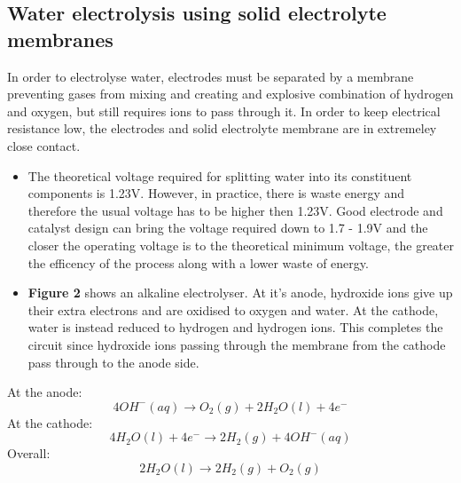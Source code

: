 \documentclass{article}
\begin{document}
    \subsection{Water electrolysis using solid electrolyte membranes}
    In order to electrolyse water, electrodes must be separated by a membrane preventing gases from mixing 
    and creating and explosive combination of hydrogen and oxygen, but still requires ions to pass through it. 
    In order to keep electrical resistance low, the electrodes and solid electrolyte membrane are in extremeley close contact. 
    \newline
    \begin{itemize}
        \item The theoretical voltage required for splitting water into its constituent components is 1.23V. 
        However, in practice, there is waste energy and therefore the usual voltage has to be higher then 1.23V. 
        Good electrode and catalyst design can bring the voltage required down to 1.7 - 1.9V and the closer the operating 
        voltage is to the theoretical minimum voltage, the greater the efficency of the process along with a lower waste of energy.
        \item \textbf{Figure 2} shows an alkaline electrolyser. At it's anode, hydroxide ions give up their extra electrons and are 
        oxidised to oxygen and water. At the cathode, water is instead reduced to hydrogen and hydrogen ions. This completes the 
        circuit since hydroxide ions passing through the membrane from the cathode pass through to the anode side.
    \end{itemize}
    At the anode: \cite{ETH}
    \begin{equation}
        4OH^-(aq)\rightarrow O_2(g) + 2H_2O(l) + 4e^-
    \end{equation}
    At the cathode: \cite{ETH}
    \begin{equation}
        4H_2O(l) + 4e^- \rightarrow 2H_2(g) + 4OH^-(aq) 
    \end{equation}
    Overall: \cite{ETH}
    \begin{equation}
        2H_2O(l) \rightarrow 2H_2(g) + O_2(g)
    \end{equation}
\end{document}
